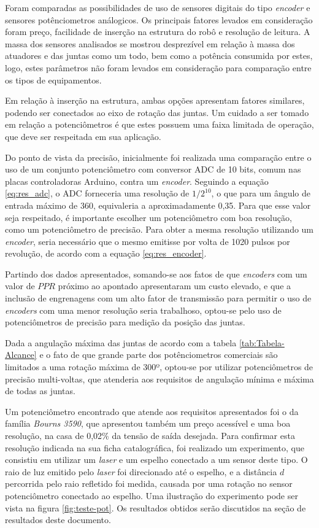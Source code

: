 Foram comparadas as possibilidades de uso de sensores digitais do tipo \textit{encoder}
e sensores potênciometros análogicos.
Os principais fatores levados em consideração foram preço, facilidade de 
inserção na estrutura do robô e resolução de leitura. 
A massa dos sensores analisados se mostrou desprezível em relação à massa dos 
atuadores e das juntas como um todo, bem como a potência consumida por 
estes, logo, estes parâmetros não foram levados em consideração para 
comparação entre os tipos de equipamentos.

Em relação à inserção na estrutura, ambas opções apresentam fatores similares, 
podendo ser conectados ao eixo de rotação das juntas. 
Um cuidado a ser tomado em relação a potenciômetros é que estes possuem uma 
faixa limitada de operação, que deve ser respeitada em sua aplicação.

Do ponto de vista da precisão, inicialmente foi realizada uma comparação entre o uso de 
um conjunto potenciômetro com conversor ADC de 10 bits, comum nas placas controladoras
Arduino, contra um \textit{encoder}.  
Seguindo a equação \ref{eq:res_adc}, o ADC forneceria uma resolução de $1/2^{10}$, o que para 
um ângulo de entrada máximo de 360\textdegree, equivaleria a aproximadamente 0,35\textdegree.
Para que esse valor seja respeitado, é importante escolher um potenciômetro com boa resolução, 
como um potenciômetro de precisão.
Para obter a mesma resolução utilizando um \textit{encoder}, seria necessário que o mesmo emitisse
por volta de 1020 pulsos por revolução, de acordo com a equação \ref{eq:res_encoder}.

Partindo dos dados apresentados, somando-se aos fatos de que \textit{encoders} com 
um valor de $PPR$ próximo ao apontado apresentaram um custo elevado, e que a 
inclusão de engrenagens com um alto fator de transmissão para permitir o uso 
de \textit{encoders} com uma menor resolução seria trabalhoso, optou-se pelo
uso de potenciômetros de precisão para medição da posição das juntas.

Dada a angulação máxima das juntas de acordo com a tabela 
\ref{tab:Tabela-Alcance} e o fato de que grande parte dos potênciometros 
comerciais são limitados a uma rotação máxima de 300º, optou-se por 
utilizar potenciômetros de precisão multi-voltas, que atenderia aos 
requisitos de angulação mínima e máxima de todas as juntas.

Um potenciômetro encontrado que atende aos requisitos apresentados foi o da 
família \textit{Bourns 3590}, que apresentou também um preço acessível e 
uma boa resolução, na casa de 0,02\% da tensão de saída desejada. Para confirmar
esta resolução indicada na sua ficha catalográfica, foi realizado um experimento, 
que consistiu em utilizar um \textit{laser} e um espelho conectado a um sensor 
deste tipo. O raio de luz emitido pelo \textit{laser} foi direcionado até o 
espelho, e a distância $d$ percorrida pelo raio refletido foi medida, causada por 
uma rotação no sensor potenciômetro conectado ao espelho. 
Uma ilustração do experimento pode ser vista na figura \ref{fig:teste-pot}. 
Os resultados obtidos serão discutidos na seção de resultados deste documento.

